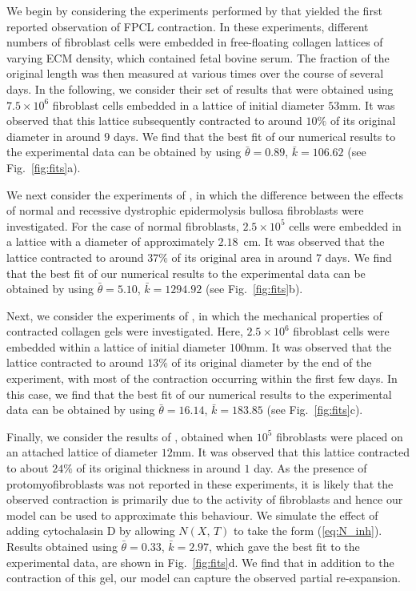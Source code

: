 We begin by considering the experiments performed by \citet{Bell1979} that yielded the first reported observation of FPCL contraction. In these experiments, different numbers of fibroblast cells were embedded in free-floating collagen lattices of varying ECM density, which contained fetal bovine serum. The fraction of the original length was then measured at various times over the course of several days. In the following, we consider their set of results that were obtained using $7.5\times 10^{6}$ fibroblast cells embedded in a lattice of initial diameter $53$mm. It was observed that this lattice subsequently contracted to around $10\%$ of its original diameter in around $9$ days. We find that the best fit of our numerical results to the experimental data can be obtained by using $\bar{\theta}=0.89$, $\bar{k}=106.62$ (see Fig.~\ref{fig:fits}a).

We next consider the experiments of \citet{Talas1997}, in which the difference between the effects of normal and recessive dystrophic epidermolysis bullosa fibroblasts were investigated. For the case of normal fibroblasts, $2.5\times 10^{5}$ cells were embedded in a lattice with a diameter of approximately $2.18$~cm. It was observed that the lattice contracted to around $37\%$ of its original area in around $7$ days. We find that the best fit of our numerical results to the experimental data can be obtained by using $\bar{\theta}=5.10$, $\bar{k}=1294.92$ (see Fig.~\ref{fig:fits}b).

Next, we consider the experiments of \citet{Feng2003}, in which the mechanical properties of contracted collagen gels were investigated. Here, $2.5\times 10^{6}$ fibroblast cells were embedded within a lattice of initial diameter $100$mm. It was observed that the lattice contracted to around $13\%$ of its original diameter by the end of the experiment, with most of the contraction occurring within the first few days. In this case, we find that the best fit of our numerical results to the experimental data can be obtained by using $\bar{\theta}=16.14$, $\bar{k}=183.85$ (see Fig.~\ref{fig:fits}c).

Finally, we consider the results of \citet{Guidry1985}, obtained when $10^{5}$ fibroblasts were placed on an attached lattice of diameter $12$mm. It was observed that this lattice contracted to about $24\%$ of its original thickness in around $1$ day. As the presence of protomyofibroblasts was not reported in these experiments, it is likely that the observed contraction is primarily due to the activity of fibroblasts and hence our model can be used to approximate this behaviour. We simulate the effect of adding cytochalasin D by allowing $N(X,\,T)$ to take the form (\ref{eq:N_inh}). Results obtained using $\bar{\theta}=0.33$, $\bar{k}=2.97$, which gave the best fit to the experimental data, are shown in Fig.~\ref{fig:fits}d. We find that in addition to the contraction of this gel, our model can capture the observed partial re-expansion.

